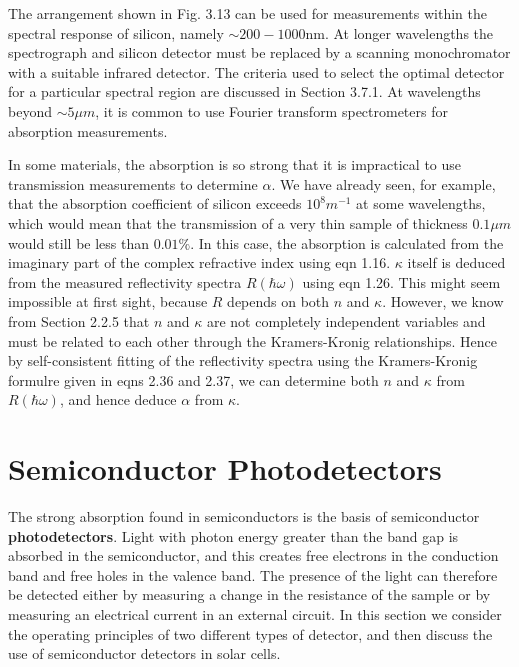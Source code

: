 \documentclass[12pt]{book}
\begin{document}
The arrangement shown in Fig. 3.13 can be used for measurements within the spectral response of silicon, namely  $\sim200-1000 \mathrm{nm}$. At longer wavelengths the spectrograph and silicon detector must be replaced by a scanning monochromator with a suitable infrared detector. The criteria used to select the optimal detector for a particular spectral region are discussed in Section 3.7.1. At wavelengths beyond $\sim5\mu m$, it is common to use Fourier transform spectrometers for absorption measurements.

In some materials, the absorption is so strong that it is impractical to use transmission measurements to determine $\alpha$. We have already seen, for example, that the absorption coefficient of silicon exceeds $10^8 m^{-1}$ at some wavelengths, which would mean that the transmission of a very thin sample of thickness $0.1\mu m$ would still be less than $0.01\%$. In this case, the absorption is calculated from the imaginary part of the complex refractive index using eqn 1.16. $\kappa$ itself is deduced from the measured reflectivity spectra $R(\hbar\omega)$ using eqn 1.26. This might seem impossible at first sight, because $R$ depends on both $n$ and $\kappa$. However, we know from Section 2.2.5 that $n$ and $\kappa$ are not completely independent variables and must be related to each other through the Kramers-Kronig relationships. Hence by self-consistent fitting of the reflectivity spectra using the Kramers-Kronig formulre given in eqns 2.36 and 2.37, we can determine both $n$ and $\kappa$ from $R(\hbar\omega)$, and hence deduce $\alpha$ from $\kappa$.

\section{Semiconductor Photodetectors}

The strong absorption found in semiconductors is the basis of semiconductor \textbf{photodetectors}. Light with photon energy greater than the band gap is absorbed in the semiconductor, and this creates free electrons in the conduction band and free holes in the valence band. The presence of the light can therefore be detected either by measuring a change in the resistance of the sample or by measuring an electrical current in an external circuit. In this section we consider the operating principles of two different types of detector, and then discuss the use of semiconductor detectors in solar cells.
\end{document}
